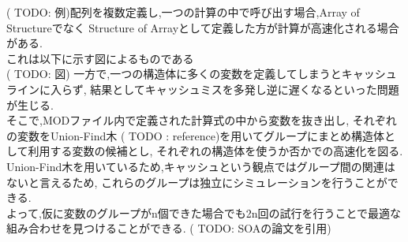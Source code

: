 ( TODO: 例)配列を複数定義し,一つの計算の中で呼び出す場合,Array of Structureでなく
Structure of Arrayとして定義した方が計算が高速化される場合がある.\\
これは以下に示す図によるものである\\
( TODO: 図)
一方で,一つの構造体に多くの変数を定義してしまうとキャッシュラインに入らず,
結果としてキャッシュミスを多発し逆に遅くなるといった問題が生じる.\\
そこで,MODファイル内で定義された計算式の中から変数を抜き出し,
それぞれの変数をUnion-Find木 ( TODO : reference)を用いてグループにまとめ構造体として利用する変数の候補とし,
それぞれの構造体を使うか否かでの高速化を図る.\\
Union-Find木を用いているため,キャッシュという観点ではグループ間の関連はないと言えるため,
これらのグループは独立にシミュレーションを行うことができる.\\
よって,仮に変数のグループがn個できた場合でも2n回の試行を行うことで最適な組み合わせを見つけることができる.
( TODO: SOAの論文を引用)
